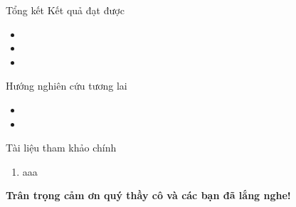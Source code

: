 \documentclass[aspectratio=169, 10pt]{beamer}
\begin{document}
\begin{frame}{Tổng kết}
Kết quả đạt được
\begin{itemize}
    \item 
    \item 
    \item 
\end{itemize}
Hướng nghiên cứu tương lai
\begin{itemize}
    \item 
    \item 
\end{itemize}
    
\end{frame}

\begin{frame}{Tài liệu tham khảo chính}
\begin{enumerate}
    \item aaa
\end{enumerate}
\end{frame}



\begin{frame}
    \begin{center}
        \huge\color{darkred}\bfseries Trân trọng cảm ơn quý thầy cô và các bạn đã lắng nghe!
    \end{center}
\end{frame}
\end{document}
